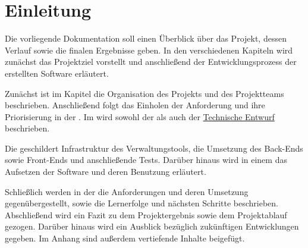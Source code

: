 \chapter{Einleitung}
Die vorliegende Dokumentation soll einen Überblick über das Projekt, dessen Verlauf sowie die finalen Ergebnisse geben.
In den verschiedenen Kapiteln wird zunächst das Projektziel vorstellt und anschließend der Entwicklungsprozess der erstellten Software erläutert.

Zunächst ist im Kapitel  die Organisation des Projekts und des Projektteams beschrieben.
Anschließend folgt das Einholen der Anforderung und ihre Priorisierung in der .
Im  wird sowohl der  als auch der \hyperref[ch:Technischer Entwurf]{Technische Entwurf} beschrieben.

Die  geschildert Infrastruktur des Verwaltungstools, die Umsetzung des Back-Ends sowie Front-Ends und anschließende Tests.
Darüber hinaus wird in einem  das Aufsetzen der Software und deren Benutzung erläutert.

Schließlich werden in der  die Anforderungen und deren Umsetzung gegenübergestellt, sowie die Lernerfolge und nächsten Schritte beschrieben.
Abschließend wird ein Fazit zu dem Projektergebnis sowie dem Projektablauf gezogen.
Darüber hinaus wird ein Ausblick bezüglich zukünftigen Entwicklungen gegeben.
Im Anhang sind außerdem vertiefende Inhalte beigefügt.